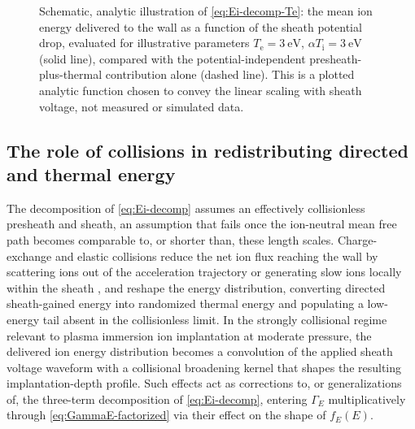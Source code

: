 \begin{figure}[htbp]
\centering
{}
\caption{Schematic, analytic illustration of \cref{eq:Ei-decomp-Te}: the mean ion energy delivered to the wall as a function of the sheath potential drop, evaluated for illustrative parameters $T_{\mathrm{e}} = \SI{3}{\electronvolt}$, $\alpha T_{\mathrm i} = \SI{3}{\electronvolt}$ (solid line), compared with the potential-independent presheath-plus-thermal contribution alone (dashed line). This is a plotted analytic function chosen to convey the linear scaling with sheath voltage, not measured or simulated data.}
\label{fig:Ei-vs-V}
\end{figure}

\subsection{The role of collisions in redistributing directed and thermal energy}

The decomposition of \cref{eq:Ei-decomp} assumes an effectively collisionless presheath and sheath, an assumption that fails once the ion-neutral mean free path becomes comparable to, or shorter than, these length scales. Charge-exchange and elastic collisions reduce the net ion flux reaching the wall by scattering ions out of the acceleration trajectory or generating slow ions locally within the sheath \cite{ref0077}, and reshape the energy distribution, converting directed sheath-gained energy into randomized thermal energy and populating a low-energy tail absent in the collisionless limit. In the strongly collisional regime relevant to plasma immersion ion implantation at moderate pressure, the delivered ion energy distribution becomes a convolution of the applied sheath voltage waveform with a collisional broadening kernel that shapes the resulting implantation-depth profile. Such effects act as corrections to, or generalizations of, the three-term decomposition of \cref{eq:Ei-decomp}, entering $\Gamma_{E}$ multiplicatively through \cref{eq:GammaE-factorized} via their effect on the shape of $f_E(E)$.

